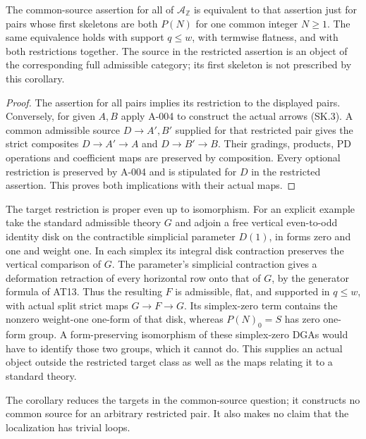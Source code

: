 \begin{corollary}
\label{A005}
The common-source assertion for all of $\mathcal A_{\mathbb Z}$
is equivalent to that assertion just for pairs whose first
skeletons are both $P(N)$ for one common integer $N\geq1$.
The same equivalence holds with support $q\leq w$, with
termwise flatness, and with both restrictions together.
The source in the restricted assertion is an object of the
corresponding full admissible category; its first skeleton is
not prescribed by this corollary.
\end{corollary}
\begin{proof}
The assertion for all pairs implies its restriction to the
displayed pairs. Conversely, for given $A,B$ apply A-004
to construct the actual arrows (SK.3). A common admissible
source $D\to A',B'$ supplied for that restricted pair gives
the strict composites $D\to A'\to A$ and $D\to B'\to B$.
Their gradings, products, PD operations and coefficient maps
are preserved by composition. Every optional restriction is
preserved by A-004 and is stipulated for $D$ in the restricted
assertion. This proves both implications with their actual maps.
\end{proof}

The target restriction is proper even up to isomorphism.
For an explicit example take the standard admissible theory $G$
and adjoin a free vertical even-to-odd identity disk on the
contractible simplicial parameter $D(1)$, in forms zero and one
and weight one. In each simplex its integral disk contraction
preserves the vertical comparison of $G$. The parameter's
simplicial contraction gives a deformation retraction of every
horizontal row onto that of $G$, by the generator formula of
AT13. Thus the resulting $F$ is admissible, flat, and supported
in $q\leq w$, with actual split strict maps $G\to F\to G$.
Its simplex-zero term contains the nonzero weight-one one-form
of that disk, whereas $P(N)_0=S$ has zero one-form group.
A form-preserving isomorphism of these simplex-zero DGAs
would have to identify those two groups, which it cannot do.
This supplies an actual object outside the restricted target
class as well as the maps relating it to a standard theory.

The corollary reduces the targets in the common-source question;
it constructs no common source for an arbitrary restricted pair.
It also makes no claim that the localization has trivial loops.
